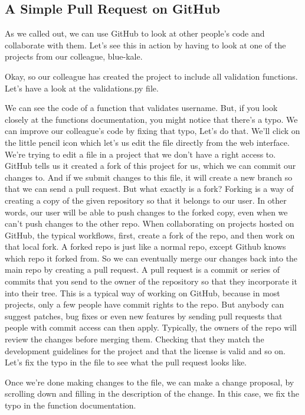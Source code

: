 	\subsection{A Simple Pull Request on GitHub}
	
	As we called out, we can use GitHub to look at other people's code and collaborate with them. Let's see this in action by having to look at one of the projects from our colleague, blue-kale.
	
	Okay, so our colleague has created the project to include all validation functions. Let's have a look at the validations.py file.
	
	We can see the code of a function that validates username. But, if you look closely at the functions documentation, you might notice that there's a typo. We can improve our colleague's code by fixing that typo, Let's do that. We'll click on the little pencil icon which let's us edit the file directly from the web interface. We're trying to edit a file in a project that we don't have a right access to. GitHub tells us it created a fork of this project for us, which we can commit our changes to. And if we submit changes to this file, it will create a new branch so that we can send a pull request. But what exactly is a fork? Forking is a way of creating a copy of the given repository so that it belongs to our user. In other words, our user will be able to push changes to the forked copy, even when we can't push changes to the other repo. When collaborating on projects hosted on GitHub, the typical workflows, first, create a fork of the repo, and then work on that local fork. A forked repo is just like a normal repo, except Github knows which repo it forked from. So we can eventually merge our changes back into the main repo by creating a pull request. A pull request is a commit or series of commits that you send to the owner of the repository so that they incorporate it into their tree. This is a typical way of working on GitHub, because in most projects, only a few people have commit rights to the repo. But anybody can suggest patches, bug fixes or even new features by sending pull requests that people with commit access can then apply. Typically, the owners of the repo will review the changes before merging them. Checking that they match the development guidelines for the project and that the license is valid and so on. Let's fix the typo in the file to see what the pull request looks like.
	
	Once we're done making changes to the file, we can make a change proposal, by scrolling down and filling in the description of the change. In this case, we fix the typo in the function documentation.
	
